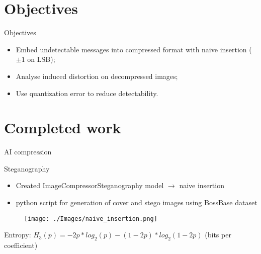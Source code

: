 \documentclass[11pt,compress]{beamer} %
\begin{document}
\section{Objectives}
\begin{frame}{Objectives}
  \begin{itemize}
    \item Embed undetectable messages into compressed format with naive insertion ($\pm1$ on LSB);\vspace{.7cm}
    \item Analyse induced distortion on decompressed images;\vspace{.7cm}
    \item Use quantization error to reduce detectability.
  \end{itemize}
\end{frame}


\section{Completed work}
\begin{frame}{AI compression}
\end{frame}

\begin{frame}{Steganography}
  \begin{itemize}
    \item Created ImageCompressorSteganography model $\rightarrow$ naive insertion
    \item python script for generation of cover and stego images using BossBase dataset
  \end{itemize}
  \begin{figure}
    \texttt{[image: ./Images/naive\_insertion.png]}
  \end{figure}
  \centering
  Entropy: $H_3(p) = -2p*log_2(p) - (1-2p)*log_2(1-2p)$ (bits per coefficient)
\end{frame}
\end{document}
